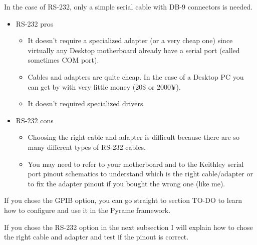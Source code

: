 In the case of RS-232, only a simple serial cable with DB-9 connectors is needed.
\begin{itemize}
\item RS-232 pros
  \begin{itemize}
  \item It doesn't require a specialized adapter (or a very cheap one)
    since virtually any Desktop motherboard already have a serial port (called
    sometimes COM port).
  \item Cables and adapters are quite cheap. In the case of a Desktop PC you
    can get by with very little money (20\$ or 2000¥).
  \item It doesn't required specialized drivers
  \end{itemize}
\item RS-232 cons
  \begin{itemize}
  \item Choosing the right cable and adapter is difficult because there are so
    many different types of RS-232 cables.
  \item You may need to refer to your motherboard and to the Keithley serial
    port pinout schematics to understand which is the right cable/adapter or to
    fix the adapter pinout if you bought the wrong one (like me).
  \end{itemize}
\end{itemize}
If you chose the GPIB option, you can go straight to section TO-DO to learn how
to configure and use it in the Pyrame framework.

If you chose the RS-232 option in the next subsection I will explain how to
chose the right cable and adapter and test if the pinout is correct.
